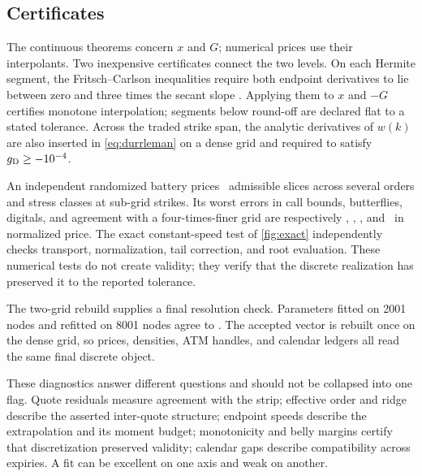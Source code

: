 \subsection{Certificates}
\label{sec:certificates}

The continuous theorems concern $x$ and $G$; numerical prices use their
interpolants.  Two inexpensive certificates connect the two levels.  On each
Hermite segment, the Fritsch--Carlson inequalities require both endpoint
derivatives to lie between zero and three times the secant slope
\citep{FritschCarlson1980}.  Applying them to $x$ and $-G$ certifies monotone
interpolation; segments below round-off are declared flat to a stated
tolerance.  Across the traded strike span, the analytic derivatives of
$w(k)$ are also inserted in \eqref{eq:durrleman} on a dense grid and required
to satisfy $g_{\rm D}\ge-10^{-4}$.

An independent randomized battery prices \MacAuditSliceCount\ admissible
slices across several orders and stress classes at sub-grid strikes.  Its
worst errors in call bounds, butterflies, digitals, and agreement with a
four-times-finer grid are respectively
\MacAuditBoundsWorst, \MacAuditFlyWorst, \MacAuditDigitalWorst, and
\MacAuditGridAgreeWorst\ in normalized price.  The exact constant-speed test
of \cref{fig:exact} independently checks transport, normalization, tail
correction, and root evaluation.  These numerical tests do not create
validity; they verify that the discrete realization has preserved it to the
reported tolerance.

The two-grid rebuild supplies a final resolution check.  Parameters fitted on
2001 nodes and refitted on 8001 nodes agree to \MacTwoGridParamAgree.  The
accepted vector is rebuilt once on the dense grid, so prices, densities, ATM
handles, and calendar ledgers all read the same final discrete object.

These diagnostics answer different questions and should not be collapsed
into one flag.  Quote residuals measure agreement with the strip; effective
order and ridge describe the asserted inter-quote structure; endpoint speeds
describe the extrapolation and its moment budget; monotonicity and belly
margins certify that discretization preserved validity; calendar gaps
describe compatibility across expiries.  A fit can be excellent on one axis
and weak on another.
